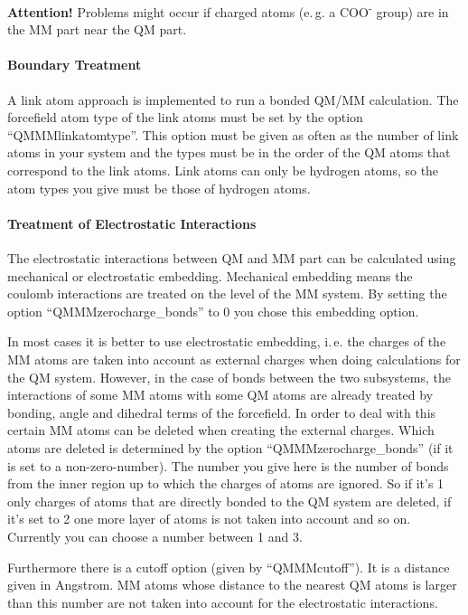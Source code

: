 \documentclass[10pt,a4paper]{article} %
\begin{document}
\textbf{Attention!} Problems might occur if charged atoms (e.\,g. a COO\textsuperscript{-} group) are in the MM part near the QM part.

\paragraph{Boundary Treatment \\}

A link atom approach is implemented to run a bonded QM/MM calculation. The forcefield atom type of the link atoms must be set by the option ``QMMMlinkatomtype''. This option must be given as often as the number of link atoms in your system and the types must be in the order of the QM atoms that correspond to the link atoms. Link atoms can only be hydrogen atoms, so the atom types you give must be those of hydrogen atoms.

\paragraph{Treatment of Electrostatic Interactions\\}

The electrostatic interactions between QM and MM part can be calculated using mechanical  or electrostatic embedding. Mechanical embedding means the coulomb interactions are treated on the level of the MM system. By setting the option ``QMMMzerocharge\_bonds'' to 0 you chose this embedding option.

In most cases it is better to use electrostatic embedding, i.\,e. the charges of the MM atoms are taken into account as external charges when doing calculations for the QM system. However, in the case of bonds between the two subsystems, the interactions of some MM atoms with some QM atoms are already treated by bonding, angle and dihedral terms of the forcefield. In order to deal with this certain MM atoms can be deleted when creating the external charges. Which atoms are deleted is determined by the option ``QMMMzerocharge\_bonds'' (if it is set to a non-zero-number). The number you give here is the number of bonds from the inner region up to which the charges of atoms are ignored. So if it's 1 only charges of atoms that are directly bonded to the QM system are deleted, if it's set to 2 one more layer of atoms is not taken into account and so on. Currently you can choose a number between 1 and 3.

Furthermore there is a cutoff option (given by ``QMMMcutoff''). It is a distance given in Angstrom. MM atoms whose distance to the nearest QM atoms is larger than this number are not taken into account for the electrostatic interactions.
\end{document}
